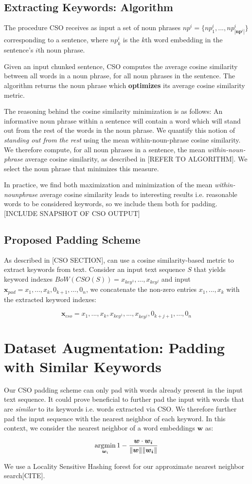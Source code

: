 \subsection{Extracting Keywords: Algorithm}

The procedure CSO receives as input a set of noun phrases $np^i = \{np^{i}_{1}, ..., np^i_{|\bm{np}^i|}\}$ corresponding
to a sentence, where $np^{i}_{k}$ is the $k$th word embedding in the sentence’s $i$th noun phrase.

Given an input chunked sentence, CSO computes the average cosine similarity between
all words in a noun phrase, for all noun phrases in the sentence. The algorithm returns the
noun phrase which \textbf{optimizes} its average cosine similarity metric.

The reasoning behind the cosine similarity minimization is as follows: An informative
noun phrase within a sentence will contain a word which will stand out from the rest of the
words in the noun phrase. We quantify this notion of \textit{standing out from the rest} using the
mean within-noun-phrase cosine similarity. We therefore compute, for all noun phrases in a
sentence, the mean \textit{within-noun-phrase} average cosine similarity, as described in [REFER TO ALGORITHM].
We select the noun phrase that minimizes this measure.

In practice, we find both maximization and minimization of the mean \textit{within-nounphrase}
average cosine similarity leads to interesting results i.e. reasonable words to be
considered keywords, so we include them both for padding.
[INCLUDE SNAPSHOT OF CSO OUTPUT]

\subsection{Proposed Padding Scheme}
As described in [CSO SECTION], can use a cosine similarity-based metric to extract
keywords from text. Consider an input text sequence $S$ that yields keyword indexes
$BoW(CSO(S)) = x_{key^1}, ..., x_{key^j}$ and input $\bm{x}_{pad} = x_1, ..., x_k, 0_{k+1}, ..., 0_n$, we concatenate
the non-zero entries $x_1, ..., x_k$ with the extracted keyword indexes:

\[\bm{x}_{cso} = x_1, ..., x_k, x_{key^1}, ..., x_{key^j}, 0_{k+j+1}, ..., 0_n\]


\section{Dataset Augmentation: Padding with Similar Keywords}
Our CSO padding scheme can only pad with words already present in the input
text sequence. It could prove beneficial to further pad the input with words that are \textit{similar}
to its keywords i.e. words extracted via CSO. We therefore further pad the input sequence
with the nearest neighbor of each keyword. In this context, we consider the nearest neighbor
of a word embeddings $\bm{w}$ as:

\[\operatorname*{\arg\!\min}_{\bm{w}_i} 1 - \frac{\bm{w} \cdot \bm{w_i}}{\lVert \bm{w} \rVert \lVert \bm{w_i} \rVert}\]

We use a Locality Sensitive Hashing forest for our approximate nearest neighbor search[CITE].
